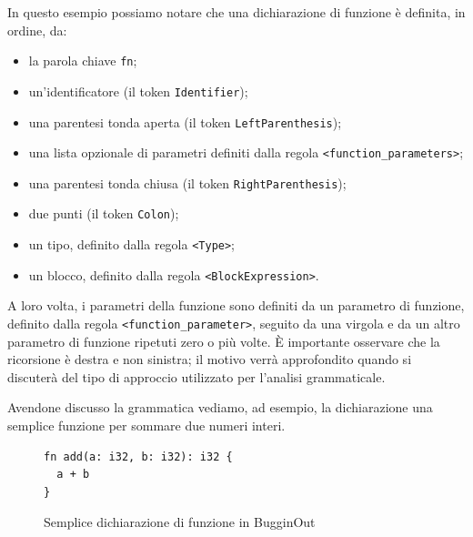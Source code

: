 In questo esempio possiamo notare che una dichiarazione di funzione \`e definita, in ordine, da:
\begin{itemize}
	\item la parola chiave \texttt{fn};
	\item un'identificatore (il token \texttt{Identifier});
	\item una parentesi tonda aperta (il token \texttt{LeftParenthesis});
	\item una lista opzionale di parametri definiti dalla regola \linebreak \texttt{<function\_parameters>};
	\item una parentesi tonda chiusa (il token \texttt{RightParenthesis});
	\item due punti (il token \texttt{Colon});
	\item un tipo, definito dalla regola \texttt{<Type>};
	\item un blocco, definito dalla regola \texttt{<BlockExpression>}.
\end{itemize}

A loro volta, i parametri della funzione sono definiti da un parametro di funzione, definito dalla regola \texttt{<function\_parameter>}, seguito da una virgola e da un altro parametro di funzione ripetuti zero o pi\`u volte. \`E importante osservare che la ricorsione \`e destra e non sinistra; il motivo verr\`a approfondito quando si discuter\`a del tipo di approccio utilizzato per l'analisi grammaticale.

Avendone discusso la grammatica vediamo, ad esempio, la dichiarazione una semplice funzione per sommare due numeri interi.
\begin{figure}[H]
	\centering
	\begin{verbatim}
fn add(a: i32, b: i32): i32 {
  a + b
}
	\end{verbatim}
	\label{fig:bugginout-example-function-declaration}
	\caption{Semplice dichiarazione di funzione in BugginOut}
\end{figure}

